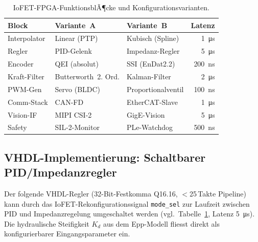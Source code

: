 ﻿\documentclass[a4paper,12pt]{scrreprt}
\theoremstyle{definition}
\begin{document}
\begin{table}[H]
\centering
\caption{IoFET-FPGA-FunktionsblÃ¶cke und Konfigurationsvarianten.}
\label{tab:fpga_blocks}
\small
\begin{tabularx}{\linewidth}{|l|l|X|r|}
\hline
\rowcolor{iofetblue!20}
\textbf{Block} & \textbf{Variante~A} & \textbf{Variante~B} & \textbf{Latenz} \\
\hline
Interpolator & Linear (PTP) & Kubisch (Spline) & \SI{1}{\micro\second} \\
\hline
Regler & PID-Gelenk & Impedanz-Regler & \SI{5}{\micro\second} \\
\hline
Encoder & QEI (absolut) & SSI (EnDat2.2) & \SI{200}{\nano\second} \\
\hline
Kraft-Filter & Butterworth~2. Ord. & Kalman-Filter & \SI{2}{\micro\second} \\
\hline
PWM-Gen & Servo (BLDC) & Proportionalventil & \SI{100}{\nano\second} \\
\hline
Comm-Stack & CAN-FD & EtherCAT-Slave & \SI{1}{\micro\second} \\
\hline
Vision-IF & MIPI CSI-2 & GigE-Vision & \SI{5}{\micro\second} \\
\hline
Safety & SIL-2-Monitor & PLe-Watchdog & \SI{500}{\nano\second} \\
\hline
\end{tabularx}
\end{table}

\subsection{VHDL-Implementierung: Schaltbarer PID/Impedanzregler}

Der folgende VHDL-Regler (32-Bit-Festkomma Q16.16, $<$25\,Takte Pipeline)
kann durch das IoFET-Rekonfigurationssignal \texttt{mode\_sel}
zur Laufzeit zwischen PID und Impedanzregelung umgeschaltet werden
(vgl.~Tabelle~\ref{tab:fpga_blocks}, Latenz \SI{5}{\micro\second}).
Die hydraulische Steifigkeit $K_d$ aus dem Epp-Modell fliesst direkt
als konfigurierbarer Eingangsparameter ein.
\end{document}
